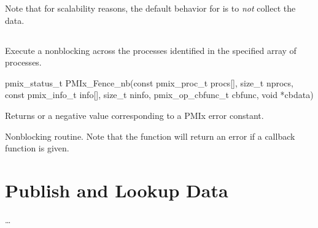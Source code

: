 Note that for scalability reasons, the default behavior for  is to \emph{not} collect the data.


\subsection{}

\summary

Execute a nonblocking  across the processes identified in the specified array of processes.

\format

\cspecificstart
\begin{codepar}
pmix_status_t
PMIx_Fence_nb(const pmix_proc_t procs[], size_t nprocs,
              const pmix_info_t info[], size_t ninfo,
              pmix_op_cbfunc_t cbfunc, void *cbdata)
\end{codepar}
\cspecificend

\begin{arglist}
\end{arglist}

Returns  or a negative value corresponding to a PMIx error constant.

\descr

Nonblocking  routine.
Note that the function will return an error if a  callback function is given.


\section{Publish and Lookup Data}
\label{chap:api_kv_mgmt:publish}

\ldots

\subsection{}

